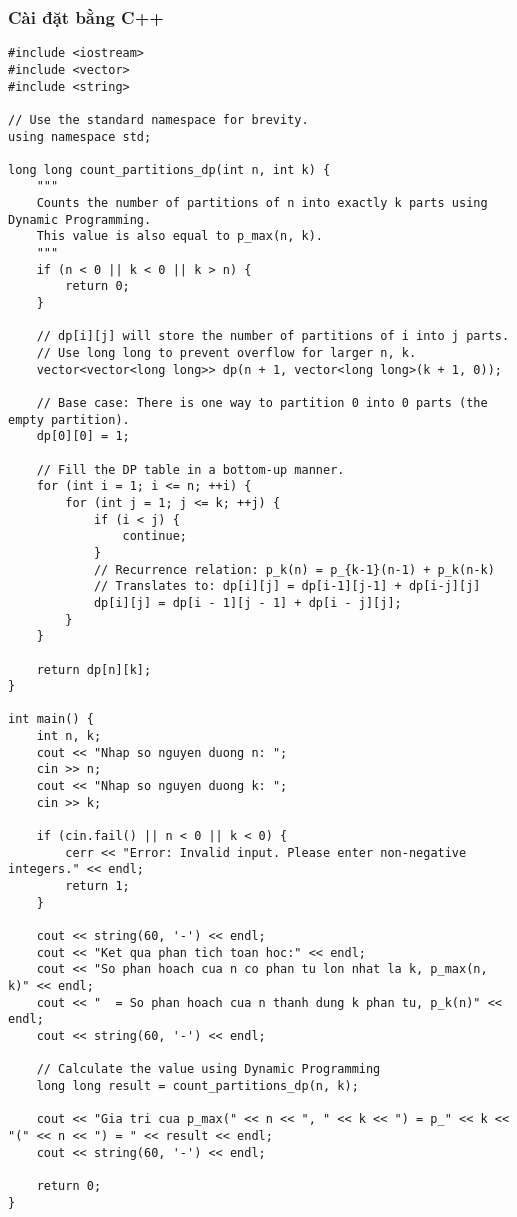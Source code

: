 \documentclass[a4paper,12pt]{article}
\begin{document}
\subsubsection{Cài đặt bằng C++}
\begin{lstlisting}[style=cppstyle, caption={Counting partitions using Dynamic Programming in C++.}, label={lst:cpp_count}]
#include <iostream>
#include <vector>
#include <string>

// Use the standard namespace for brevity.
using namespace std;

long long count_partitions_dp(int n, int k) {
    """
    Counts the number of partitions of n into exactly k parts using Dynamic Programming.
    This value is also equal to p_max(n, k).
    """
    if (n < 0 || k < 0 || k > n) {
        return 0;
    }

    // dp[i][j] will store the number of partitions of i into j parts.
    // Use long long to prevent overflow for larger n, k.
    vector<vector<long long>> dp(n + 1, vector<long long>(k + 1, 0));

    // Base case: There is one way to partition 0 into 0 parts (the empty partition).
    dp[0][0] = 1;

    // Fill the DP table in a bottom-up manner.
    for (int i = 1; i <= n; ++i) {
        for (int j = 1; j <= k; ++j) {
            if (i < j) {
                continue;
            }
            // Recurrence relation: p_k(n) = p_{k-1}(n-1) + p_k(n-k)
            // Translates to: dp[i][j] = dp[i-1][j-1] + dp[i-j][j]
            dp[i][j] = dp[i - 1][j - 1] + dp[i - j][j];
        }
    }

    return dp[n][k];
}

int main() {
    int n, k;
    cout << "Nhap so nguyen duong n: ";
    cin >> n;
    cout << "Nhap so nguyen duong k: ";
    cin >> k;

    if (cin.fail() || n < 0 || k < 0) {
        cerr << "Error: Invalid input. Please enter non-negative integers." << endl;
        return 1;
    }

    cout << string(60, '-') << endl;
    cout << "Ket qua phan tich toan hoc:" << endl;
    cout << "So phan hoach cua n co phan tu lon nhat la k, p_max(n, k)" << endl;
    cout << "  = So phan hoach cua n thanh dung k phan tu, p_k(n)" << endl;
    cout << string(60, '-') << endl;

    // Calculate the value using Dynamic Programming
    long long result = count_partitions_dp(n, k);

    cout << "Gia tri cua p_max(" << n << ", " << k << ") = p_" << k << "(" << n << ") = " << result << endl;
    cout << string(60, '-') << endl;

    return 0;
}
\end{lstlisting}
\end{document}
